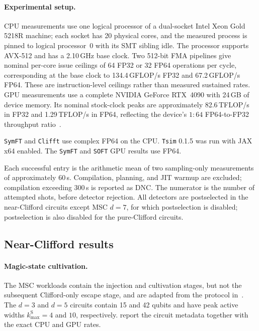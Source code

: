 \documentclass[a4paper,onecolumn,unpublished]{quantumarticle}
\newcommand{\cref}[1]{\zcref{#1}}
\newcommand{\tFont}[1]{\texttt{#1}}
\newcommand{\symft}{\tFont{SymFT}}
\newcommand{\soft}{\tFont{SOFT}}
\newcommand{\tsim}{\tFont{Tsim}}
\newcommand{\clifft}{\tFont{Clifft}}
\begin{document}
\paragraph{Experimental setup.}
CPU measurements use one logical processor of a dual-socket Intel Xeon Gold 5218R machine; each socket has 20 physical cores, and the measured process is pinned to logical processor~0 with its SMT sibling idle.
The processor supports AVX-512 and has a 2.10\,GHz base clock.
Two 512-bit FMA pipelines give nominal per-core issue ceilings of 64 FP32 or 32 FP64 operations per cycle, corresponding at the base clock to 134.4\,GFLOP/s FP32 and 67.2\,GFLOP/s FP64.
These are instruction-level ceilings rather than measured sustained rates.
GPU measurements use a complete NVIDIA GeForce RTX~4090 with 24\,GB of device memory.
Its nominal stock-clock peaks are approximately 82.6\,TFLOP/s in FP32 and 1.29\,TFLOP/s in FP64, reflecting the device's $1{:}64$ FP64-to-FP32 throughput ratio~\cite{NVIDIA4090,NVIDIACUDABPG}.

\symft{} and \clifft{} use complex FP64 on the CPU. \tsim{} 0.1.5 was run with JAX x64 enabled. The \symft{} and \soft{} GPU results use FP64.


Each successful entry is the arithmetic mean of two sampling-only measurements of approximately 60\,s.
Compilation, planning, and JIT warmup are excluded; compilation exceeding 300\,s is reported as DNC.
The numerator is the number of attempted shots, before detector rejection.
All detectors are postselected in the near-Clifford circuits except MSC $d=7$, for which postselection is disabled; postselection is also disabled for the pure-Clifford circuits.

\subsection{Near-Clifford results}

\paragraph{Magic-state cultivation.}
The MSC workloads contain the injection and cultivation stages, but not the subsequent Clifford-only escape stage, and are adapted from the protocol in~\cite{GSJ24}.
The $d=3$ and $d=5$ circuits contain 15 and 42 qubits and have peak active widths $k_{\max}^{\mathrm S}=4$ and $10$, respectively.
\cref{tab:benchmark-msc-cpu,tab:benchmark-msc-gpu} report the circuit metadata together with the exact CPU and GPU rates.
\end{document}
